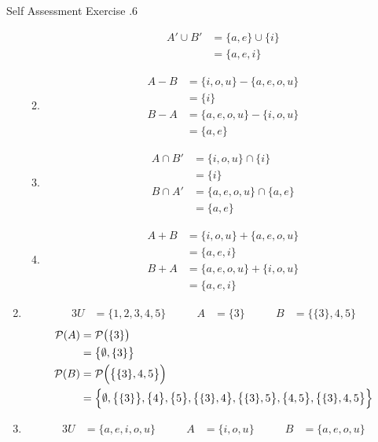 \documentclass[../notes.tex]{subfiles}
\begin{document}
\begin{exercise}{Self Assessment Exercise \thechapter.6}
\begin{enumerate}
\begin{enumerate}[label=(\alph*)]
\begin{align*}
									A' \cup B' &= \{a, e\} \cup \{i\}\\
									&= \{a, e, i\}
								\end{align*}
							\item \moveup
								\begin{align*}
									A - B &= \{i, o, u\} - \{a, e, o, u\}\\
									&= \{i\}\\
									B - A &= \{a, e, o, u\} - \{i, o, u\}\\
									&= \{a,e\}
								\end{align*}
							\item \moveup
								\begin{align*}
									A \cap B' &= \{i, o, u\} \cap \{i\}\\
									&= \{i\}\\
									B \cap A' &= \{a, e, o, u\} \cap \{a, e\}\\
									&= \{a, e\}
								\end{align*}
							\item \moveup
								\begin{align*}
									A + B &= \{i, o, u\} + \{a, e, o, u\}\\
									&= \{a, e, i\}\\
									B + A &= \{a, e, o, u\} + \{i, o, u\}\\
									&= \{a, e, i\}
								\end{align*}
						\end{enumerate}
					\item \moveup
						\begin{alignat*}{3}
							U &= \{1, 2, 3, 4, 5\} \qquad & A &= \{3\} \qquad & B &= \bigl\{\{3\}, 4, 5\bigr\}
						\end{alignat*}
						\begin{align*}
							\mathcal{P}(A) &= \mathcal{P}\bigl(\{3\}\bigr)\\
							&= \bigl\{\emptyset, \{3\}\bigr\}\\
							\mathcal{P}(B) &= \mathcal{P}\Bigl(\bigl\{\{3\}, 4, 5\bigr\}\Bigr)\\
							&= \Bigl\{\emptyset, \bigl\{\{3\}\bigr\}, \bigl\{4\bigr\}, \bigl\{5\bigr\}, \bigl\{\{3\}, 4\bigr\}, \bigl\{\{3\}, 5\bigr\}, \bigl\{4, 5\bigr\}, \bigl\{\{3\}, 4, 5\bigr\}\Bigr\}
						\end{align*}
					\pagebreak
					\item \moveup
						\begin{alignat*}{3}
							U &= \{a, e, i, o, u\} \qquad & A &= \{i, o, u\} \qquad & B &= \{a, e, o, u\}

\end{alignat*}
\end{enumerate}
\end{exercise}
\end{document}
